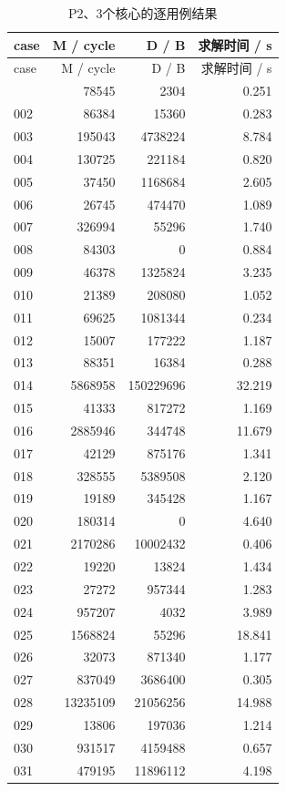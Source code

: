 \documentclass[anonymous,notoc]{gmcm2026}
\begin{document}
\begin{longtable}{lrrr}
\caption{P2、3个核心的逐用例结果}\\
\toprule
case & M / cycle & D / B & 求解时间 / s\\\midrule
\endfirsthead
\toprule
case & M / cycle & D / B & 求解时间 / s\\\midrule
\endhead
\bottomrule\endfoot
001 & 78545 & 2304 & 0.251 \\
002 & 86384 & 15360 & 0.283 \\
003 & 195043 & 4738224 & 8.784 \\
004 & 130725 & 221184 & 0.820 \\
005 & 37450 & 1168684 & 2.605 \\
006 & 26745 & 474470 & 1.089 \\
007 & 326994 & 55296 & 1.740 \\
008 & 84303 & 0 & 0.884 \\
009 & 46378 & 1325824 & 3.235 \\
010 & 21389 & 208080 & 1.052 \\
011 & 69625 & 1081344 & 0.234 \\
012 & 15007 & 177222 & 1.187 \\
013 & 88351 & 16384 & 0.288 \\
014 & 5868958 & 150229696 & 32.219 \\
015 & 41333 & 817272 & 1.169 \\
016 & 2885946 & 344748 & 11.679 \\
017 & 42129 & 875176 & 1.341 \\
018 & 328555 & 5389508 & 2.120 \\
019 & 19189 & 345428 & 1.167 \\
020 & 180314 & 0 & 4.640 \\
021 & 2170286 & 10002432 & 0.406 \\
022 & 19220 & 13824 & 1.434 \\
023 & 27272 & 957344 & 1.283 \\
024 & 957207 & 4032 & 3.989 \\
025 & 1568824 & 55296 & 18.841 \\
026 & 32073 & 871340 & 1.177 \\
027 & 837049 & 3686400 & 0.305 \\
028 & 13235109 & 21056256 & 14.988 \\
029 & 13806 & 197036 & 1.214 \\
030 & 931517 & 4159488 & 0.657 \\
031 & 479195 & 11896112 & 4.198 \\

\end{longtable}
\end{document}
